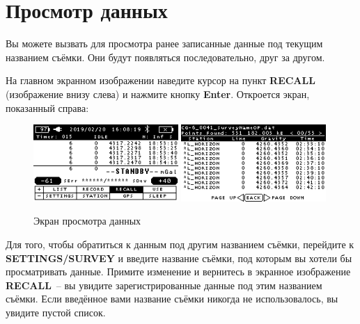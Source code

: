 



\section{Просмотр данных}

Вы можете вызвать для просмотра ранее записанные данные под текущим названием
съёмки. Они будут появляться последовательно, друг за другом.

На главном экранном изображении наведите курсор на пункт \textbf{RECALL}
(изображение внизу слева) и нажмите кнопку \textbf{Enter}. Откроется экран,
показанный справа:

\begin{figure}[h]
  \centering
  \includegraphics[width=0.49\textwidth]{figures/the_data_recall_screen_1}
  \includegraphics[width=0.49\textwidth]{figures/the_data_recall_screen_2}
  \caption{Экран просмотра данных}
  \label{fig:the_data_recall_screen}
\end{figure}

Для того, чтобы обратиться к данным под другим названием съёмки, перейдите к
\textbf{SETTINGS/SURVEY} и введите название съёмки, под которым вы хотели бы
просматривать данные. Примите изменение и вернитесь в экранное изображение
\textbf{RECALL}~-- вы увидите зарегистрированные данные под этим названием
съёмки.  Если введённое вами название съёмки никогда не использовалось, вы
увидите пустой список.

